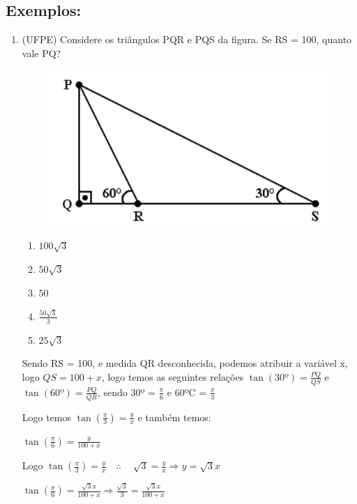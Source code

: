 \begin{multicols*}{2}
    \subsection*{Exemplos:}
    \begin{enumerate}
    \item(UFPE) Considere os triângulos PQR e PQS da figura. Se RS = 100, quanto vale PQ?
    
    \begin{figure}[H]
        \includegraphics[scale=0.38]{assets/rafael/img39.png}
    \end{figure}
        \begin{enumerate}
        \item $100 \sqrt{3}$
        \item $50 \sqrt{3} $
        \item $ 50$
        \item $\frac{50 \sqrt{3}}{3}$
        \item $25 \sqrt{3}$
        \end{enumerate}
    Sendo RS = 100, e medida QR desconhecida, podemos atribuir a variável x, logo $QS = 100 + x$, logo temos as seguintes relações $\tan(30º) = \frac{PQ}{QS}$ e $\tan(60º) = \frac{PQ}{QR}$, sendo 30º = $\frac{\pi}{6}$ e 60ºC = $\frac{\pi}{3}$
    
    Logo temos $\tan \left( \frac{\pi}{3} \right) = \frac{y}{x}$ e também temos:
    
    $\tan \left( \frac{\pi}{6} \right) = \frac{y}{100 +x}$
    
    Logo $\tan \left( \frac{\pi}{3} \right) = \frac{y}{x} \quad \therefore \quad\ \sqrt{3} = \frac{y}{x} \Rightarrow y = \sqrt{3}x$
    
    $\tan \left( \frac{\pi}{6} \right) = \frac{\sqrt{3} x}{100 +x} \Rightarrow 
    \frac{\sqrt{3}}{3} = \frac{\sqrt{3} x}{100 +x}$
    

\end{enumerate}
\end{multicols*}
